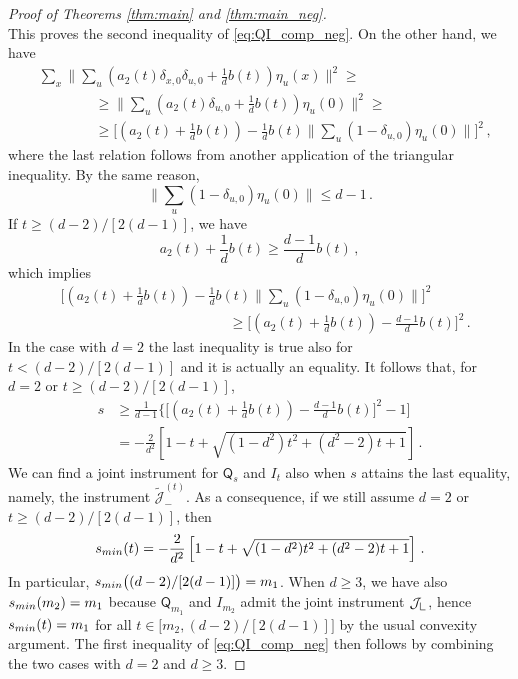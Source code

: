 \documentclass[10pt,a4paper]{amsart}
\newcommand{\Lcorner}{{\mathchoice{\mathrel{\makebox[7pt][c]{\rule{.4pt}{7.5pt}\rule{5pt}{.4pt}}}}{\mathrel{\makebox[7pt][c]{\rule{.4pt}{7.5pt}\rule{5pt}{.4pt}}}}{\mathrel{\makebox[5.5pt][c]{\rule{.4pt}{5.25pt}\rule{3.5pt}{.4pt}}}}{\mathrel{\makebox[4pt][c]{\rule{.4pt}{3.75pt}\rule{2.5pt}{.4pt}}}}}}
\newcommand{\Qo}{\mathsf{Q}}%
\newcommand{\ii}{\mathcal{J}}
\begin{document}
\begin{proof}[Proof of Theorems \ref{thm:main} and \ref{thm:main_neg}]
$$$$
This proves the second inequality of \eqref{eq:QI_comp_neg}. On the other hand, we have
\begin{align*}
& \sum_x \bigg\|\sum_u \left(a_2(t)\delta_{x,0}\delta_{u,0} + \frac{1}{d} b(t)\right) \eta_u(x)\bigg\|^2 \geq \\
& \qquad\qquad \geq \bigg\|\sum_u \left(a_2(t)\delta_{u,0} + \frac{1}{d} b(t)\right) \eta_u(0)\bigg\|^2 \geq \\
& \qquad\qquad \geq \bigg[\left(a_2(t) + \frac{1}{d} b(t)\right) - \frac{1}{d} b(t) \bigg\|\sum_u (1-\delta_{u,0}) \eta_u(0)\bigg\|\bigg]^2 \,,
\end{align*}
where the last relation follows from another application of the triangular inequality. By the same reason,
$$
\bigg\|\sum_u (1-\delta_{u,0}) \eta_u(0)\bigg\| \leq d-1 \,.
$$
If $t\geq (d-2)/[2(d-1)]$, we have
$$
a_2(t) + \frac{1}{d} b(t) \geq \frac{d-1}{d} b(t) \,,
$$
which implies
\begin{align*}
& \bigg[\left(a_2(t) + \frac{1}{d} b(t)\right) - \frac{1}{d} b(t) \bigg\|\sum_u (1-\delta_{u,0}) \eta_u(0)\bigg\|\bigg]^2  \\
& \qquad\qquad\qquad\qquad\qquad\qquad \geq \bigg[\left(a_2(t) + \frac{1}{d} b(t)\right) - \frac{d-1}{d} b(t) \bigg]^2 \,.
\end{align*}
In the case with $d=2$ the last inequality is true also for $t<(d-2)/[2(d-1)]$ and it is actually an equality. It follows that, for $d=2$ or $t\geq (d-2)/[2(d-1)]$,
\begin{align*}
s & \geq \frac{1}{d-1} \bigg\{ \bigg[\left(a_2(t) + \frac{1}{d} b(t)\right) - \frac{d-1}{d} b(t) \bigg]^2 - 1 \bigg] \\
& = - \frac{2}{d^2}\left[1 - t + \sqrt{(1 - d^2) t^2 + (d^2 - 2) t + 1}\right]\,.
\end{align*}
We can find a joint instrument for $\Qo_s$ and $I_t$ also when $s$ attains the last equality, namely, the instrument $\tilde{\ii}_-^{(t)}$. As a consequence, if we still assume $d=2$ or $t\geq (d-2)/[2(d-1)]$, then
$$
s_{\rm min}(t) = - \frac{2}{d^2}\left[1 - t + \sqrt{(1 - d^2) t^2 + (d^2 - 2) t + 1}\right] \,.
$$
In particular, $s_{\rm min}\big((d-2)/[2(d-1)]\big) = m_1$. When $d\geq 3$, we have also $s_{\rm min}(m_2) = m_1$ because $\Qo_{m_1}$ and $I_{m_2}$ admit the joint instrument $\ii_\Lcorner$, hence $s_{\rm min}(t) = m_1$ for all $t\in\big[m_2,(d-2)/[2(d-1)]\big]$ by the usual convexity argument. The first inequality of \eqref{eq:QI_comp_neg} then follows by combining the two cases with $d=2$ and $d\geq 3$. 
\end{proof}
\end{document}
